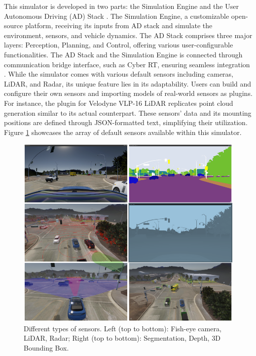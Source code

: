 \documentclass[12pt,twoside,a4paper,parskip]{scrbook} %
\begin{document}
This simulator is developed in two parts: the Simulation Engine and the User Autonomous Driving (AD) Stack \cite{lgsvl}. The Simulation Engine, a customizable open-source platform, receiving its inputs from AD stack and simulate the environment, sensors, and vehicle dynamics. The AD Stack comprises three major layers: Perception, Planning, and Control, offering various user-configurable functionalities. The AD Stack and the Simulation Engine is connected through communication bridge interface, such as Cyber RT, ensuring seamless integration \cite{lgsvl}. While the simulator comes with various default sensors including cameras, LiDAR, and Radar, its unique feature lies in its adaptability. Users can build and configure their own sensors and importing models of real-world sensors as plugins. For instance, the plugin for Velodyne VLP-16 LiDAR replicates point cloud generation similar to its actual counterpart. These sensors' data and its mounting positions are defined through JSON-formatted text, simplifying their utilization. Figure \ref{fig:LGVSL} showcases the array of default sensors available within this simulator.

\begin{figure}[h]
    \centering
    \includegraphics[width=1.0\textwidth]{Images/LGVSL_Sensor.png}
    \caption[Different types of sensors used in LGSVL Simulator]{Different types of sensors. Left (top to bottom): Fish-eye camera, LiDAR, Radar; Right (top to bottom): Segmentation, Depth, 3D Bounding Box.}
    \label{fig:LGVSL}
  \end{figure}
\end{document}
